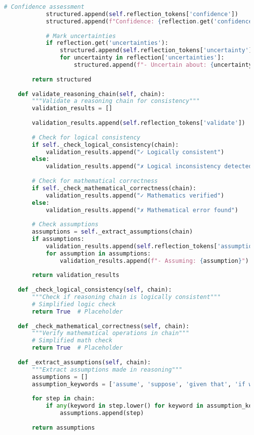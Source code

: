 \begin{lstlisting}[language=Python, caption=Self-reflection and verification tokens]
            # Confidence assessment
            structured.append(self.reflection_tokens['confidence'])
            structured.append(f"Confidence: {reflection.get('confidence', 'medium')}")
            
            # Mark uncertainties
            if reflection.get('uncertainties'):
                structured.append(self.reflection_tokens['uncertainty'])
                for uncertainty in reflection['uncertainties']:
                    structured.append(f"- Uncertain about: {uncertainty}")
        
        return structured
    
    def validate_reasoning_chain(self, chain):
        """Validate a reasoning chain for consistency"""
        validation_results = []
        
        validation_results.append(self.reflection_tokens['validate'])
        
        # Check for logical consistency
        if self._check_logical_consistency(chain):
            validation_results.append("✓ Logically consistent")
        else:
            validation_results.append("✗ Logical inconsistency detected")
        
        # Check for mathematical correctness
        if self._check_mathematical_correctness(chain):
            validation_results.append("✓ Mathematics verified")
        else:
            validation_results.append("✗ Mathematical error found")
        
        # Check assumptions
        assumptions = self._extract_assumptions(chain)
        if assumptions:
            validation_results.append(self.reflection_tokens['assumption'])
            for assumption in assumptions:
                validation_results.append(f"- Assuming: {assumption}")
        
        return validation_results
    
    def _check_logical_consistency(self, chain):
        """Check if reasoning chain is logically consistent"""
        # Simplified logic check
        return True  # Placeholder
    
    def _check_mathematical_correctness(self, chain):
        """Verify mathematical operations in chain"""
        # Simplified math check
        return True  # Placeholder
    
    def _extract_assumptions(self, chain):
        """Extract assumptions made in reasoning"""
        assumptions = []
        assumption_keywords = ['assume', 'suppose', 'given that', 'if we consider']
        
        for step in chain:
            if any(keyword in step.lower() for keyword in assumption_keywords):
                assumptions.append(step)
        
        return assumptions
\end{lstlisting}

